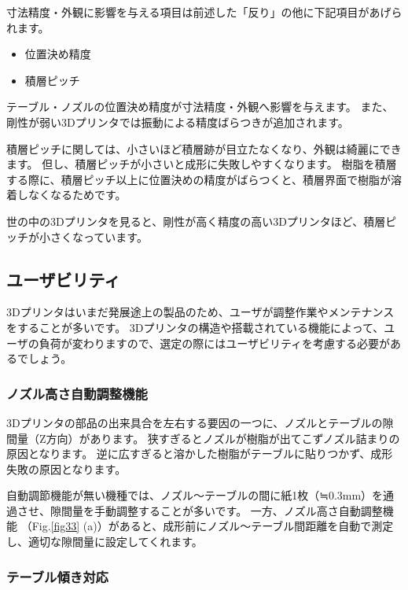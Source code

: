 寸法精度・外観に影響を与える項目は前述した「反り」の他に下記項目があげられます。

\begin{itemize}
\tightlist
\item
  位置決め精度
\item
  積層ピッチ
\end{itemize}

テーブル・ノズルの位置決め精度が寸法精度・外観へ影響を与えます。
また、剛性が弱い3Dプリンタでは振動による精度ばらつきが追加されます。

積層ピッチに関しては、小さいほど積層跡が目立たなくなり、外観は綺麗にできます。
但し、積層ピッチが小さいと成形に失敗しやすくなります。
樹脂を積層する際に、積層ピッチ以上に位置決めの精度がばらつくと、積層界面で樹脂が溶着しなくなるためです。

世の中の3Dプリンタを見ると、剛性が高く精度の高い3Dプリンタほど、積層ピッチが小さくなっています。

\subsection{ユーザビリティ}\label{ux30e6ux30fcux30b6ux30d3ux30eaux30c6ux30a3}

3Dプリンタはいまだ発展途上の製品のため、ユーザが調整作業やメンテナンスをすることが多いです。
3Dプリンタの構造や搭載されている機能によって、ユーザの負荷が変わりますので、選定の際にはユーザビリティを考慮する必要があるでしょう。

\subsubsection{ノズル高さ自動調整機能}\label{ux30ceux30baux30ebux9ad8ux3055ux81eaux52d5ux8abfux6574ux6a5fux80fd}

3Dプリンタの部品の出来具合を左右する要因の一つに、ノズルとテーブルの隙間量（Z方向）があります。
狭すぎるとノズルが樹脂が出てこずノズル詰まりの原因となります。
逆に広すぎると溶かした樹脂がテーブルに貼りつかず、成形失敗の原因となります。

自動調節機能が無い機種では、ノズル～テーブルの間に紙1枚（≒0.3mm）を通過させ、隙間量を手動調整することが多いです。
一方、ノズル高さ自動調整機能 （Fig.\ref{fig33}
(a)）があると、成形前にノズル～テーブル間距離を自動で測定し、適切な隙間量に設定してくれます。

\subsubsection{テーブル傾き対応}\label{ux30c6ux30fcux30d6ux30ebux50beux304dux5bfeux5fdc}

